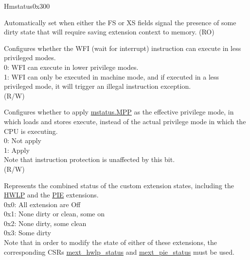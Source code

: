 \begin{register}{H}{mstatus}{0x300}\label{regdesc:MSTATUS}
%
%
%
%
%
%
%
%
%
%
%
%
%
%
%
\regnewline%
\begin{regdesc}\begin{reglist}
\label{fielddesc:MSTATUS_SD}\item [SD] Automatically set when either the FS or XS fields signal the presence of some dirty state that will require saving extension context to memory. (RO)
\label{fielddesc:MSTATUSTW}\item [TW] Configures whether the WFI (wait for interrupt) instruction can execute in less privileged modes. \\
0: WFI can execute in lower privilege modes.\\
1: WFI can only be executed in machine mode, and if executed in a less privileged mode, it will trigger an illegal instruction exception.\\
(R/W)
\label{fielddesc:MSTATUS_MPRV}\item [MPRV] Configures whether to apply \hyperref[fielddesc:MSTATUSMPP]{mstatus.MPP} as the effective privilege mode, in which loads and stores execute, instead of the actual privilege mode in which the CPU is executing. \\
0: Not apply\\
1: Apply\\
Note that instruction protection is unaffected by this bit.\\
(R/W) 
\label{fielddesc:MSTATUS_XS}\item [XS] Represents the combined status of the custom extension states, including the \hyperref[sec:riscvcpu-hwloop]{HWLP} and the \hyperref[sec:riscvcpu-pie]{PIE} extensions. \\
0x0: All extension are Off\\
0x1: None dirty or clean, some on\\
0x2: None dirty, some clean\\
0x3: Some dirty\\
Note that in order to modify the state of either of these extensions, the corresponding CSRs \hyperref[regdesc:MEXT_HWLP_STATUS]{mext\_hwlp\_status} and \hyperref[regdesc:MEXT_PIE_STATUS]{mext\_pie\_status} must be used.\\

\end{reglist}
\end{regdesc}
\end{register}
